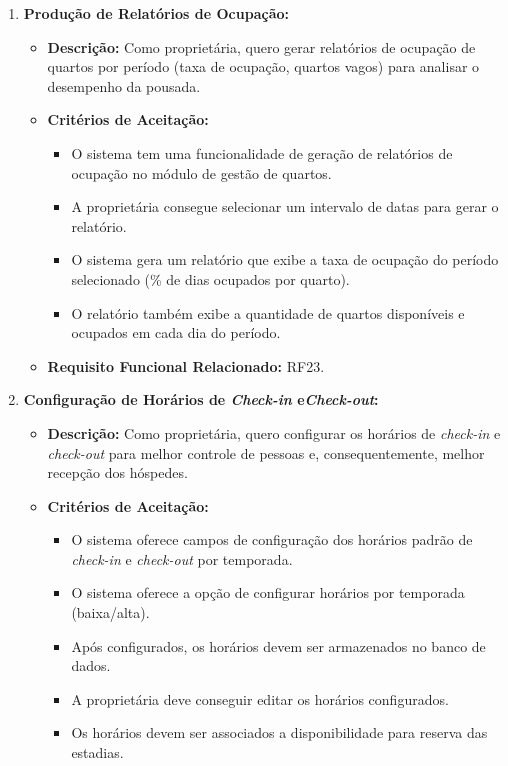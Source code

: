 \documentclass[
	12pt,				%
	openany,			%
	twoside,			%
	a4paper,			%
	english,			%
	french,				%
	spanish,			%
	brazil				%
	]{abntex2}
\begin{document}
\begin{enumerate}[label=\textbf{\arabic*.}]
\begin{itemize}
	 \end{itemize} 
	 \vspace{2cm}
	  \item \textbf{Produção de Relatórios de Ocupação:}
	 \begin{itemize}
	 	\item \textbf{Descrição:} Como proprietária, quero gerar relatórios de ocupação de quartos por período (taxa de ocupação, quartos vagos) para analisar o desempenho da pousada.
	 	\item \textbf{Critérios de Aceitação:}
	 	\begin{itemize}
	 		\item O sistema tem uma funcionalidade de geração de relatórios de ocupação no módulo de gestão de quartos.
	 		\item A proprietária consegue selecionar um intervalo de datas para gerar o relatório.
	 		\item O sistema gera um relatório que exibe a taxa de ocupação do período selecionado (\% de dias ocupados por quarto).
	 		\item O relatório também exibe a quantidade de quartos disponíveis e ocupados em cada dia do período.
	 	\end{itemize}
	 	\item \textbf{Requisito Funcional Relacionado:} RF23.
	 \end{itemize} 
	 \item \textbf{Configuração de Horários de \textit{Check-in} e\textit{Check-out}:}
	 \begin{itemize}
	 	\item \textbf{Descrição:}  Como proprietária, quero configurar os horários de \textit{check-in} e \textit{check-out} para melhor controle de pessoas e, consequentemente, melhor recepção dos hóspedes.
	 	\item \textbf{Critérios de Aceitação:}
	 	\begin{itemize}
	 		\item O sistema oferece campos de configuração dos horários padrão de \textit{check-in} e \textit{check-out} por temporada.
	 		\item O sistema oferece a opção de configurar horários por temporada (baixa/alta). 
	 		\item Após configurados, os horários devem ser armazenados no banco de dados.
	 		\item A proprietária deve conseguir editar os horários configurados.
	 		\item Os horários devem ser associados a disponibilidade para reserva das estadias.

\end{itemize}
\end{itemize}
\end{enumerate}
\end{document}
